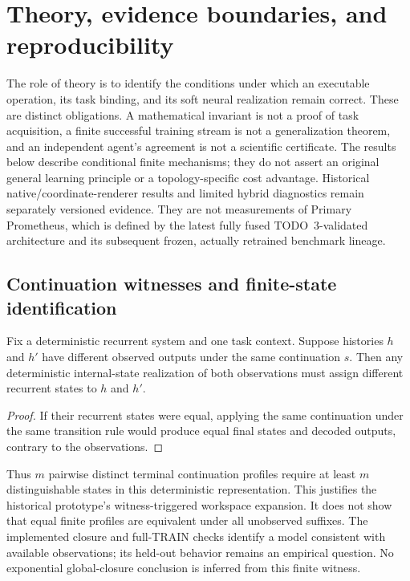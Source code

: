 \section{Theory, evidence boundaries, and reproducibility}
\label{sec:theory-reproducibility}
\label{app:evidence}

The role of theory is to identify the conditions under which an executable
operation, its task binding, and its soft neural realization remain correct.
These are distinct obligations. A mathematical invariant is not a proof of
task acquisition, a finite successful training stream is not a generalization
theorem, and an independent agent's agreement is not a scientific certificate.
The results below describe conditional finite mechanisms; they do not assert
an original general learning principle or a topology-specific cost advantage.
Historical native/coordinate-renderer results and limited hybrid diagnostics
remain separately versioned evidence. They are not measurements of Primary
Prometheus, which is defined by the latest fully fused TODO~3-validated
architecture and its subsequent frozen, actually retrained benchmark lineage.

\subsection{Continuation witnesses and finite-state identification}

\begin{proposition}
Fix a deterministic recurrent system and one task context. Suppose histories
$h$ and $h'$ have different observed outputs under the same continuation $s$.
Then any deterministic internal-state realization of both observations must
assign different recurrent states to $h$ and $h'$.
\end{proposition}
\begin{proof}
If their recurrent states were equal, applying the same continuation under the
same transition rule would produce equal final states and decoded outputs,
contrary to the observations.
\end{proof}

Thus $m$ pairwise distinct terminal continuation profiles require at least $m$
distinguishable states in this deterministic representation. This justifies
the historical prototype's witness-triggered workspace expansion. It does not show that equal
finite profiles are equivalent under all unobserved suffixes. The implemented
closure and full-TRAIN checks identify a model consistent with available
observations; its held-out behavior remains an empirical question. No
exponential global-closure conclusion is inferred from this finite witness.

